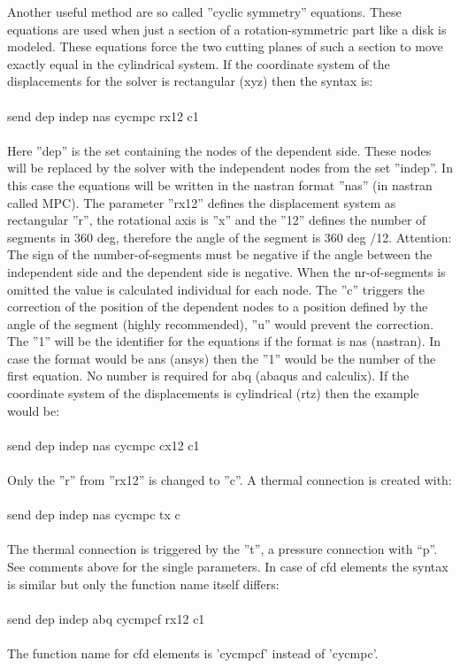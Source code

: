 \documentclass{article}
\begin{document}
Another useful method are so called ''cyclic symmetry'' equations. These equations are used when just a section of a rotation-symmetric part like a disk is modeled. These equations force the two cutting planes of such a section to move exactly equal in the cylindrical system. If the coordinate system of the displacements for the solver is rectangular (xyz) then the syntax is:\\\\send dep indep nas cycmpc rx12 c1\\\\Here ''dep'' is the set containing the nodes of the dependent side. These nodes will be replaced by the solver with the independent nodes from the set ''indep''. In this case the equations will be written in the nastran format ''nas'' (in nastran called MPC). The parameter ''rx12'' defines the displacement system as rectangular ''r'', the rotational axis is ''x'' and the ''12'' defines the number of segments in 360 deg, therefore the angle of the segment is 360 deg /12. Attention: The sign of the number-of-segments must be negative if the angle between the independent side and the dependent side is negative. When the nr-of-segments is omitted the value is calculated individual for each node. The ''c'' triggers the correction of the position of the dependent nodes to a position defined by the angle of the segment (highly recommended), ''u'' would prevent the correction. The ''1'' will be the identifier for the equations if the format is nas (nastran). In case the format would be ans (ansys) then the ''1'' would be the number of the first equation. No number is required for abq (abaqus and calculix). If the coordinate system of the displacements is cylindrical (rtz) then the example would be:\\\\send dep indep nas cycmpc cx12 c1\\\\Only the ''r'' from ''rx12'' is changed to ''c''. A thermal connection is created with:\\\\send dep indep nas cycmpc tx c\\\\The thermal connection is triggered by the ''t'', a pressure connection with ``p''. See comments above for the single parameters. In case of cfd elements the syntax is similar but only the function name itself differs:\\\\send dep indep abq cycmpcf rx12 c1\\\\The function name for cfd elements is 'cycmpcf' instead of 'cycmpc'.
\end{document}
